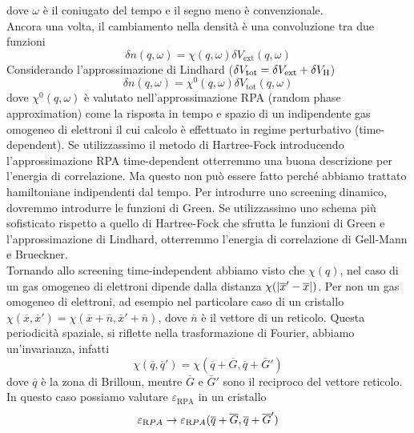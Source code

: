dove $\omega$ è il coniugato del tempo e il segno meno è convenzionale.\\
Ancora una volta, il cambiamento nella densità è una convoluzione tra due funzioni
\begin{equation*}
    \delta n(q, \omega)=\chi(q, \omega)\delta V_{\text{ext}}(q, \omega)
\end{equation*}
Considerando l'approssimazione di Lindhard ($\delta V_{\text{tot}}=\delta V_{\text{ext}}+\delta V_{\text H}$)
\begin{equation*}
    \delta n(q, \omega)=\chi^0(q, \omega)\delta V_{\text{tot}}(q, \omega)
\end{equation*}
dove $\chi^0(q, \omega)$ è valutato nell'approssimazione RPA (random phase approximation) come la risposta in tempo e spazio di un indipendente gas omogeneo di elettroni il cui calcolo è effettuato in regime perturbativo (time-dependent). Se utilizzassimo il metodo di Hartree-Fock introducendo l'approssimazione RPA time-dependent otterremmo una buona descrizione per l'energia di correlazione. Ma questo non può essere fatto perché abbiamo trattato hamiltoniane indipendenti dal tempo. Per introdurre uno screening dinamico, dovremmo introdurre le funzioni di Green. Se utilizzassimo uno schema più sofisticato rispetto a quello di Hartree-Fock che sfrutta le funzioni di Green e l'approssimazione di Lindhard, otterremmo l'energia di correlazione di Gell-Mann e Brueckner.\\
Tornando allo screening time-independent abbiamo visto che $\chi(q)$, nel caso di un gas omogeneo di elettroni dipende dalla distanza $\chi(\abs{\overline x'-\overline x})$. Per non un gas omogeneo di elettroni, ad esempio nel particolare caso di un cristallo $\chi(\overline x, \overline x')=\chi(\overline x + \overline n, \overline x' + \overline n)$, dove $\overline n$ è il vettore di un reticolo. Questa periodicità spaziale, si riflette nella trasformazione di Fourier, abbiamo un'invarianza, infatti
\begin{equation*}
    \chi(\overline q, \overline q')=\chi(\overline q+ \overline G, \overline q+ \overline G')
\end{equation*}
dove $\overline q$ è la zona di Brilloun, mentre $\overline G$ e $\overline G'$ sono il reciproco del vettore reticolo.\\
In questo caso possiamo valutare $\varepsilon_{\text{RPA}}$ in un cristallo
\begin{equation*}
    \varepsilon_{\text RPA} \rightarrow \varepsilon_{\text RPA}(\overline q+ \overline G, \overline q+ \overline G')
\end{equation*}
